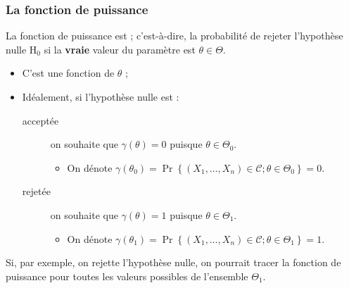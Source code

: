 \documentclass[10pt, french]{article}
\begin{document}
\begin{multicols*}{2}
\subsubsection{La fonction de puissance}

La fonction de puissance est  ; c'est-à-dire, la probabilité de rejeter l'hypothèse nulle $\mathrm{H}_{0}$ si la \textbf{vraie} valeur du paramètre est $\theta \in \Theta$. 
\begin{itemize}
	\item	C'est une fonction de $\theta$ ;
	\item	Idéalement, si l'hypothèse nulle est :
		\begin{description}
		\item[acceptée]	on souhaite que $\gamma(\theta)	=	0$ puisque $\theta \in \Theta_{0}$.
			\begin{itemize}
			\item	On dénote $\gamma(\theta_{0})	=	\Pr\left\{(X_{1}, \dots, X_{n}) \in \mathcal{C} ;  \theta \in \Theta_{0}\right\}	=	0$.
			\end{itemize}
		\item[rejetée]	on souhaite que $\gamma(\theta)	=	1$ puisque $\theta \in \Theta_{1}$.
			\begin{itemize}
			\item	On dénote $\gamma(\theta_{1})	=	\Pr\left\{(X_{1}, \dots, X_{n}) \in \mathcal{C} ; \theta \in \Theta_{1}\right\}	=	1$.
			\end{itemize}
		\end{description}
\end{itemize}

Si, par exemple, on rejette l'hypothèse nulle, on pourrait tracer la fonction de puissance pour toutes les valeurs possibles de l'ensemble $\Theta_{1}$.




\columnbreak


\end{multicols*}
\end{document}
